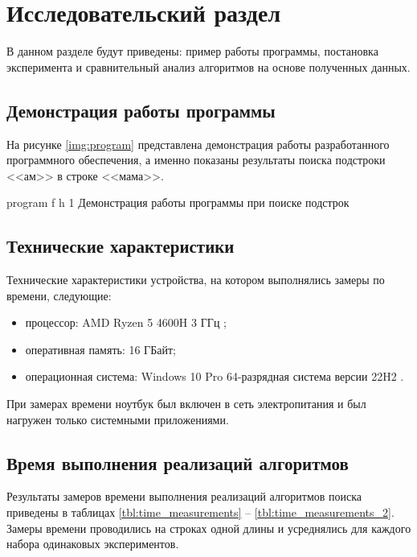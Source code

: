 \chapter{Исследовательский раздел}

В данном разделе будут приведены: пример работы программы, постановка эксперимента и сравнительный анализ алгоритмов на основе полученных данных.

\section{Демонстрация работы программы}


На рисунке \ref{img:program} представлена демонстрация работы разработанного программного обеспечения, а именно показаны результаты поиска подстроки <<ам>> в строке <<мама>>.  
\clearpage

{program} %
{f} %
{h} %
{1\textwidth} %
{Демонстрация работы программы при поиске подстрок} %

\clearpage


\section{Технические характеристики}

Технические характеристики устройства, на котором выполнялись замеры по времени, следующие:
\begin{itemize}
	\item процессор: AMD Ryzen 5 4600H 3 ГГц \cite{amd};
	\item оперативная память: 16 ГБайт;
	\item операционная система: Windows 10 Pro 64-разрядная система версии 22H2 \cite{windows}.
\end{itemize}

При замерах времени ноутбук был включен в сеть электропитания и был нагружен только системными приложениями.

\section{Время выполнения реализаций алгоритмов}

Результаты замеров времени выполнения реализаций алгоритмов поиска приведены в таблицах \ref{tbl:time_measurements} -- \ref{tbl:time_measurements_2}.
Замеры времени проводились на строках одной длины и усреднялись для каждого набора одинаковых экспериментов.

